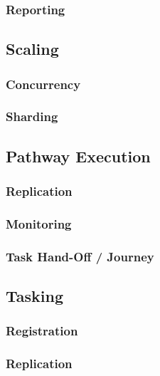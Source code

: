 \documentclass[a4paper]{book}
\begin{document}
\subsubsection{Reporting}
\label{feature:petasos.oam.reporting}

\subsection{Scaling}
\label{feature:petasos.scaling}
\subsubsection{Concurrency}
\label{feature:petasos.scaling.concurrency}

\subsubsection{Sharding}
\label{feature:petasos.scaling.sharding}

\subsection{Pathway Execution}
\label{feature:petasos.pathway}

\subsubsection{Replication}
\label{feature:petasos.pathway.replication}
\subsubsection{Monitoring}
\label{feature:petasos.pathway.monitoring}
\subsubsection{Task Hand-Off / Journey}
\label{feature:petasos.pathway.handoff}

\subsection{Tasking}
\label{feature:petasos.tasking}
\subsubsection{Registration}
\label{feature:petasos.tasking.registration}
\subsubsection{Replication}
\end{document}

